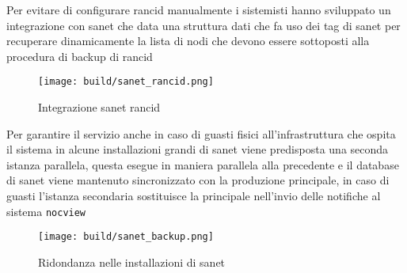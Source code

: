 \documentclass[12pt,a4paper,twoside,openright]{book}
\begin{document}
Per evitare di configurare rancid manualmente i sistemisti hanno sviluppato un integrazione con sanet che data una struttura dati che fa uso dei tag di sanet per recuperare dinamicamente la lista di nodi che devono essere sottoposti alla procedura di backup di rancid

\begin{figure}[H]
    \centering
    \texttt{[image: build/sanet\_rancid.png]}
    \caption{Integrazione sanet rancid}
    \label{fig:enter-label}
\end{figure}

Per garantire il servizio anche in caso di guasti fisici all'infrastruttura che ospita il sistema in alcune installazioni grandi di sanet viene predisposta una seconda istanza parallela, questa esegue in maniera parallela alla precedente e il database di sanet viene mantenuto sincronizzato con la produzione principale, in caso di guasti l'istanza secondaria sostituisce la principale nell'invio delle notifiche al sistema \verb|nocview|

\begin{figure}[H]
    \centering
    \texttt{[image: build/sanet\_backup.png]}
    \caption{Ridondanza nelle installazioni di sanet}
    \label{fig:enter-label}
\end{figure}

%
%
%
%
%
\end{document}
